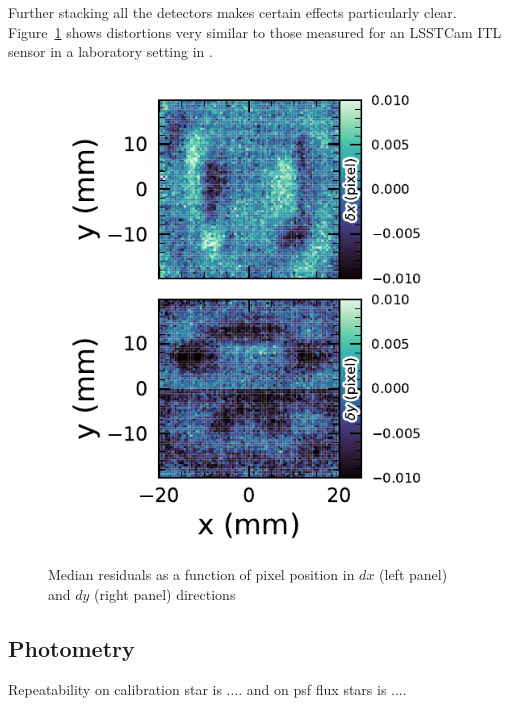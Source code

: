 Further stacking all the detectors makes certain effects particularly clear.
Figure~\ref{fig:Astrometry_CCD} shows distortions very similar to those measured for an LSSTCam ITL sensor in a laboratory setting in \citet{2023PASP..135k5003E}.
\begin{figure}[htb!]
\centering
\includegraphics[width=1.0\linewidth]{Astrometry_CCD.pdf}
\caption{\small Median residuals as a function of pixel position in $dx$ (left panel) and $dy$ (right panel) directions}
\label{fig:Astrometry_CCD}
\end{figure}

\subsection{Photometry}

Repeatability on calibration star is ....  and on psf flux stars is .... 


